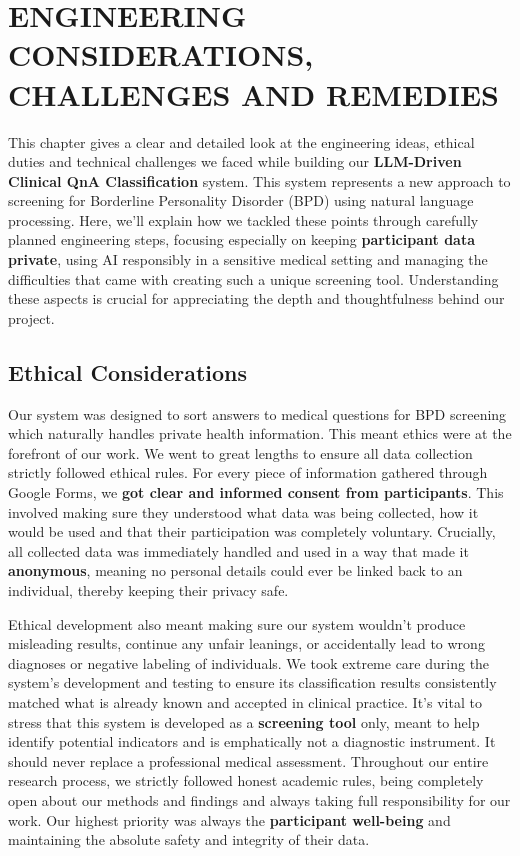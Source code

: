 \chapter{ENGINEERING CONSIDERATIONS, CHALLENGES
AND REMEDIES}
\onehalfspacing
\label{chap:engineering-considerations}
\vspace{-3em}

This chapter gives a clear and detailed look at the engineering ideas, ethical duties and technical challenges we faced while building our \textbf{LLM-Driven Clinical QnA Classification} system. This system represents a new approach to screening for Borderline Personality Disorder (BPD) using natural language processing. Here, we'll explain how we tackled these points through carefully planned engineering steps, focusing especially on keeping \textbf{participant data private}, using AI responsibly in a sensitive medical setting and managing the difficulties that came with creating such a unique screening tool. Understanding these aspects is crucial for appreciating the depth and thoughtfulness behind our project.

\section{Ethical Considerations}
Our system was designed to sort answers to medical questions for BPD screening which naturally handles private health information. This meant ethics were at the forefront of our work. We went to great lengths to ensure all data collection strictly followed ethical rules. For every piece of information gathered through Google Forms, we \textbf{got clear and informed consent from participants}. This involved making sure they understood what data was being collected, how it would be used and that their participation was completely voluntary. Crucially, all collected data was immediately handled and used in a way that made it \textbf{anonymous}, meaning no personal details could ever be linked back to an individual, thereby keeping their privacy safe.

Ethical development also meant making sure our system wouldn't produce misleading results, continue any unfair leanings, or accidentally lead to wrong diagnoses or negative labeling of individuals. We took extreme care during the system's development and testing to ensure its classification results consistently matched what is already known and accepted in clinical practice. It's vital to stress that this system is developed as a \textbf{screening tool} only, meant to help identify potential indicators and is emphatically not a diagnostic instrument. It should never replace a professional medical assessment. Throughout our entire research process, we strictly followed honest academic rules, being completely open about our methods and findings and always taking full responsibility for our work. Our highest priority was always the \textbf{participant well-being} and maintaining the absolute safety and integrity of their data.

